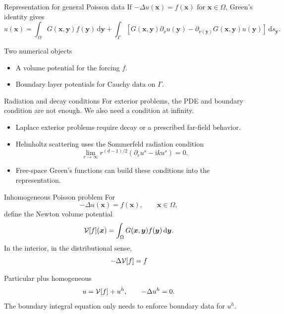 \documentclass[aspectratio=169,11pt]{beamer}
\newcommand{\dd}{\,\mathrm d}
\newcommand{\ii}{\mathrm i}
\newcommand{\x}{\bm{x}}
\newcommand{\y}{\bm{y}}
\begin{document}
\begin{frame}{Representation for general Poisson data}
\small
If $-\Delta u(\x)=f(\x)$ for $\x\in\Omega$, Green's identity gives
\[
u(\x)
=
\int_\Omega G(\x,\y)f(\y)\dd\y
+\int_\Gamma
\left[
G(\x,\y)\partial_\nu u(\y)
-\partial_{\nu(\y)}G(\x,\y)u(\y)
\right]\dd s_{\y}.
\]

\begin{block}{Two numerical objects}
\begin{itemize}
  \item A volume potential for the forcing $f$.
  \item Boundary layer potentials for Cauchy data on $\Gamma$.
\end{itemize}
\end{block}
\end{frame}

\begin{frame}{Radiation and decay conditions}
\small
For exterior problems, the PDE and boundary condition are not enough.
We also need a condition at infinity.

\begin{itemize}
  \item Laplace exterior problems require decay or a prescribed far-field
  behavior.
  \item Helmholtz scattering uses the Sommerfeld radiation condition
  \[
  \lim_{r\to\infty}r^{(d-1)/2}
  \left(\partial_r u^s-\ii k u^s\right)=0.
  \]
  \item Free-space Green's functions can build these conditions into the
  representation.
\end{itemize}
\end{frame}

\begin{frame}{Inhomogeneous Poisson problem}
\small
For
\[
  -\Delta u(\x)=f(\x),\qquad \x\in\Omega,
\]
define the Newton volume potential
\[
  \Vop[f](\x)=\int_{\Omega}G(\x,\y)f(\y)\dd\y.
\]
In the interior, in the distributional sense,
\[
  -\Delta \mathcal{V}[f]=f
\]

\begin{block}{Particular plus homogeneous}
\[
  u=\mathcal{V}[f]+u^h,\qquad -\Delta u^h=0.
\]
The boundary integral equation only needs to enforce boundary data for $u^h$.
\end{block}
\end{frame}
\end{document}
